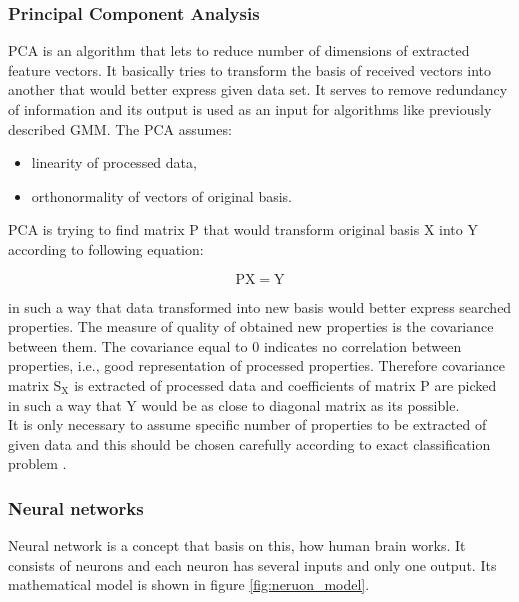 \documentclass[magister]{dyplom}
\begin{document}
	\subsubsection{Principal Component Analysis}
	
	\gls{PCA} is an algorithm that lets to reduce number of dimensions of extracted feature vectors. It basically tries to transform the basis of received vectors into another that would better express given data set. It serves to remove redundancy of information and its output is used as an input for algorithms like previously described \gls{GMM}. The \gls{PCA} assumes:
	
	\begin{itemize}
		\item linearity of processed data,
		\item orthonormality of vectors of original basis.
	\end{itemize}
	
	\gls{PCA} is trying to find matrix $\mathrm{P}$ that would transform original basis $\mathrm{X}$ into $\mathrm{Y}$ according to following equation:
	
	\begin{equation}
		\mathrm{P} \mathrm{X} = \mathrm{Y}
	\end{equation}
	
	in such a way that data transformed into new basis would better express searched properties. The measure of quality of obtained new properties is the covariance between them. The covariance equal to 0 indicates no correlation between properties, i.e., good representation of processed properties. Therefore covariance matrix $\mathrm{S}_\mathrm{X}$ is extracted of processed data and coefficients of matrix $\mathrm{P}$ are picked in such a way that $\mathrm{Y}$ would be as close to diagonal matrix as its possible. \\
	
	It is only necessary to assume specific number of properties to be extracted of given data and this should be chosen carefully according to exact classification problem \cite{PCA_tutorial}.
	
	\subsubsection{Neural networks}

	Neural network is a concept that basis on this, how human brain works. It consists of neurons and each neuron has several inputs and only one output. Its mathematical model is shown in figure \ref{fig:neruon_model}.
	
\end{document}
